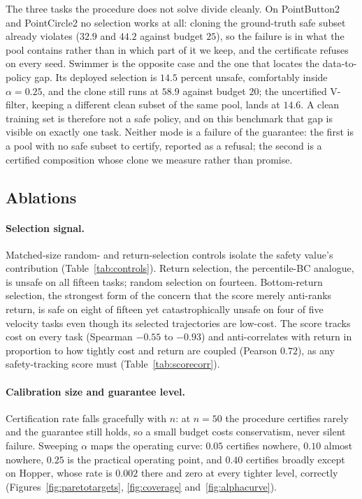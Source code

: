 \documentclass{article} %
\begin{document}
The three tasks the procedure does not solve divide cleanly. On PointButton2 and PointCircle2 no selection works at all: cloning the ground-truth safe subset already violates ($32.9$ and $44.2$ against budget $25$), so the failure is in what the pool contains rather than in which part of it we keep, and the certificate refuses on every seed. Swimmer is the opposite case and the one that locates the data-to-policy gap. Its deployed selection is $14.5$ percent unsafe, comfortably inside $\alpha = 0.25$, and the clone still runs at $58.9$ against budget $20$; the uncertified V-filter, keeping a different clean subset of the same pool, lands at $14.6$. A clean training set is therefore not a safe policy, and on this benchmark that gap is visible on exactly one task. Neither mode is a failure of the guarantee: the first is a pool with no safe subset to certify, reported as a refusal; the second is a certified composition whose clone we measure rather than promise.

\subsection{Ablations}
\label{sec:ablations}

\paragraph{Selection signal.} Matched-size random- and return-selection controls isolate the safety value's contribution (Table~\ref{tab:controls}). Return selection, the percentile-BC analogue, is unsafe on all fifteen tasks; random selection on fourteen. Bottom-return selection, the strongest form of the concern that the score merely anti-ranks return, is safe on eight of fifteen yet catastrophically unsafe on four of five velocity tasks even though its selected trajectories are low-cost. The score tracks cost on every task (Spearman $-0.55$ to $-0.93$) and anti-correlates with return in proportion to how tightly cost
and return are coupled (Pearson $0.72$), as any safety-tracking score must (Table~\ref{tab:scorecorr}).

\paragraph{Calibration size and guarantee level.} Certification rate falls gracefully with $n$: at $n = 50$ the procedure certifies rarely and the guarantee still holds, so a small budget costs conservatism, never silent failure. Sweeping $\alpha$ maps the operating curve: $0.05$ certifies nowhere, $0.10$ almost nowhere, $0.25$ is the practical operating point, and $0.40$ certifies broadly except on Hopper, whose rate is $0.002$ there and zero at every tighter level, correctly (Figures~\ref{fig:paretotargets}, \ref{fig:coverage} and~\ref{fig:alphacurve}).
\end{document}
